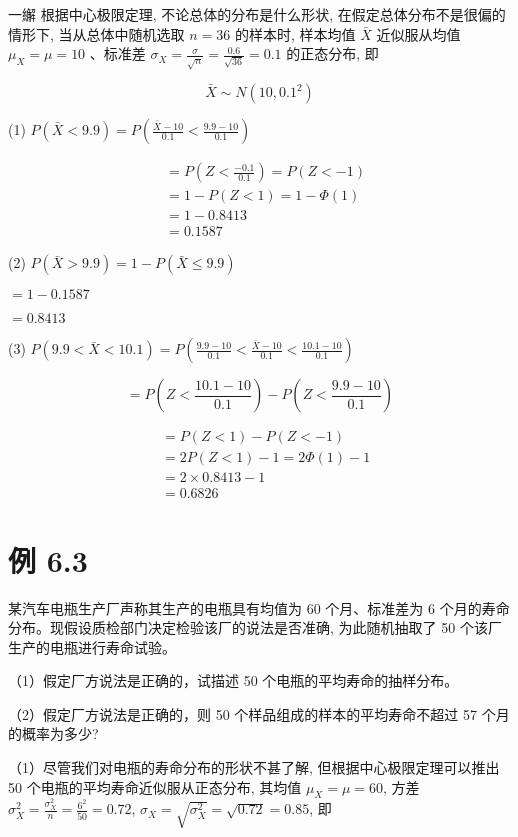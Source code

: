 \documentclass[10pt]{article}
\begin{document}
\begin{CJK*}{UTF8}{bsmi}
一繲 根据中心极限定理, 不论总体的分布是什么形状, 在假定总体分布不是很偏的情形下, 当从总体中随机选取 $n=36$ 的样本时, 样本均值 $\bar{X}$ 近似服从均值 $\mu_{X}=\mu=10$ 、标准差 $\sigma_{X}=\frac{\sigma}{\sqrt{n}}=\frac{0.6}{\sqrt{36}}=0.1$ 的正态分布, 即

$$
\bar{X} \sim N\left(10,0.1^{2}\right)
$$

(1) $P(\bar{X}<9.9)=P\left(\frac{\bar{X}-10}{0.1}<\frac{9.9-10}{0.1}\right)$

$$
\begin{aligned}
& =P\left(Z<\frac{-0.1}{0.1}\right)=P(Z<-1) \\
& =1-P(Z<1)=1-\Phi(1) \\
& =1-0.8413 \\
& =0.1587
\end{aligned}
$$

(2) $P(\bar{X}>9.9)=1-P(\bar{X} \leqslant 9.9)$

$=1-0.1587$

$=0.8413$

(3) $P(9.9<\bar{X}<10.1)=P\left(\frac{9.9-10}{0.1}<\frac{\bar{X}-10}{0.1}<\frac{10.1-10}{0.1}\right)$

$$
=P\left(Z<\frac{10.1-10}{0.1}\right)-P\left(Z<\frac{9.9-10}{0.1}\right)
$$

$$
\begin{aligned}
& =P(Z<1)-P(Z<-1) \\
& =2 P(Z<1)-1=2 \Phi(1)-1 \\
& =2 \times 0.8413-1 \\
& =0.6826
\end{aligned}
$$

\section*{例 6.3}
某汽车电瓶生产厂声称其生产的电瓶具有均值为 60 个月、标准差为 6 个月的寿命分布。现假设质检部门决定检验该厂的说法是否准确, 为此随机抽取了 50 个该厂生产的电瓶进行寿命试验。

（1）假定厂方说法是正确的，试描述 50 个电瓶的平均寿命的抽样分布。

（2）假定厂方说法是正确的，则 50 个样品组成的样本的平均寿命不超过 57 个月的概率为多少?

（1）尽管我们对电瓶的寿命分布的形状不甚了解, 但根据中心极限定理可以推出 50 个电瓶的平均寿命近似服从正态分布, 其均值 $\mu_{X}=\mu=60$, 方差 $\sigma_{X}^{2}=\frac{\sigma_{X}^{2}}{n}=\frac{6^{2}}{50}=0.72$, $\sigma_{X}=\sqrt{\sigma_{X}^{2}}=\sqrt{0.72}=0.85$, 即


\end{CJK*}
\end{document}
